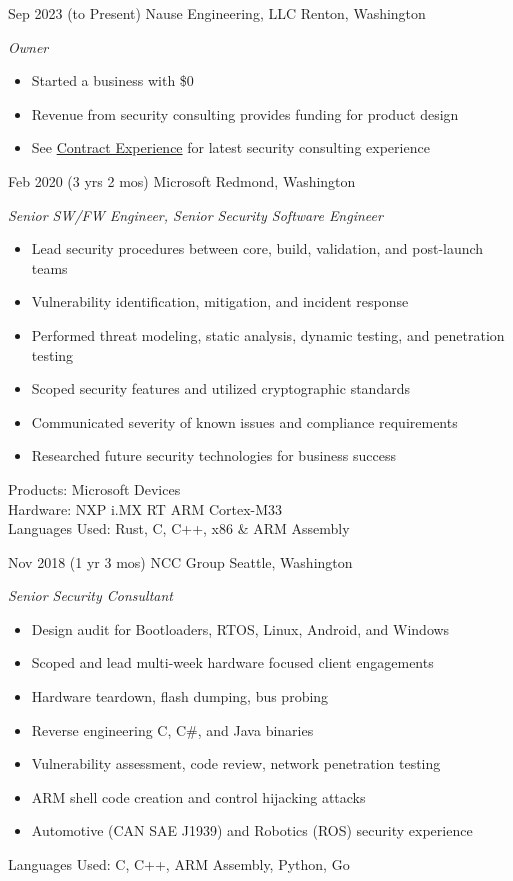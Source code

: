 \documentclass[print]{friggeri-cv} %
\begin{document}
\begin{entrylist}

\entry
{Sep 2023}
{(to Present)}
{Nause Engineering, LLC}
{Renton, Washington}
{\emph{Owner}
\begin{itemize}
\item Started a business with \$0
\item Revenue from security consulting provides funding for product design
\item See \hyperref[sec:contract-experience]{Contract Experience} for latest security consulting experience \\
\end{itemize}
}

\entry
{Feb 2020}
{(3 yrs 2 mos)}
{Microsoft}
{Redmond, Washington}
{\emph{Senior SW/FW Engineer, Senior Security Software Engineer}
\begin{itemize}
\item Lead security procedures between core, build, validation, and post-launch teams
\item Vulnerability identification, mitigation, and incident response
\item Performed threat modeling, static analysis, dynamic testing, and penetration testing
\item Scoped security features and utilized cryptographic standards
\item Communicated severity of known issues and compliance requirements
\item Researched future security technologies for business success
\end{itemize}
Products: Microsoft Devices \\
Hardware: NXP i.MX RT ARM Cortex-M33 \\
Languages Used: Rust, C, C++, x86 \& ARM Assembly \\
}

\entry
{Nov 2018}
{(1 yr 3 mos)}
{NCC Group}
{Seattle, Washington}
{\emph{Senior Security Consultant}
\begin{itemize}
\item Design audit for Bootloaders, RTOS, Linux, Android, and Windows
\item Scoped and lead multi-week hardware focused client engagements
\item Hardware teardown, flash dumping, bus probing
\item Reverse engineering C, C\#, and Java binaries
\item Vulnerability assessment, code review, network penetration testing
\item ARM shell code creation and control hijacking attacks
\item Automotive (CAN SAE J1939) and Robotics (ROS) security experience
\end{itemize}
Languages Used: C, C++, ARM Assembly, Python, Go \\
}


\end{entrylist}
\end{document}
